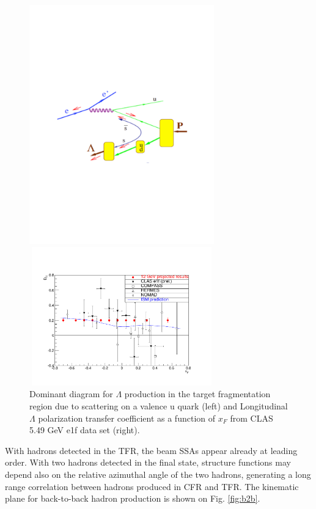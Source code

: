\documentclass[11pt,a4paper]{article}
\begin{document}
\begin{figure}
\begin{minipage}{.6\textwidth}
\includegraphics[width=8cm]{plots/lamdakin2.pdf}
\end{minipage}
\begin{minipage}{.6\textwidth}
\includegraphics[width=8cm,height=6cm,keepaspectratio]{plots/lam-vs-xf-clas12.pdf}
\end{minipage}
   \caption{Dominant diagram for $\Lambda$  production in the target fragmentation region due to
scattering on a valence u quark (left) and Longitudinal $\Lambda$ polarization transfer coefficient as a function of $x_F$ from CLAS 5.49 GeV e1f data set (right).}
 \label{fig:lambda12}
 \end{figure} 


With hadrons detected in the TFR, the  beam  SSAs appear already at leading order.
With two hadrons detected in the final state, structure functions may depend also on the relative azimuthal angle of the two hadrons, 
generating a long range correlation between hadrons produced in CFR and TFR. 
The kinematic plane for back-to-back hadron production is shown on Fig. \ref{fig:b2b}.
\end{document}
